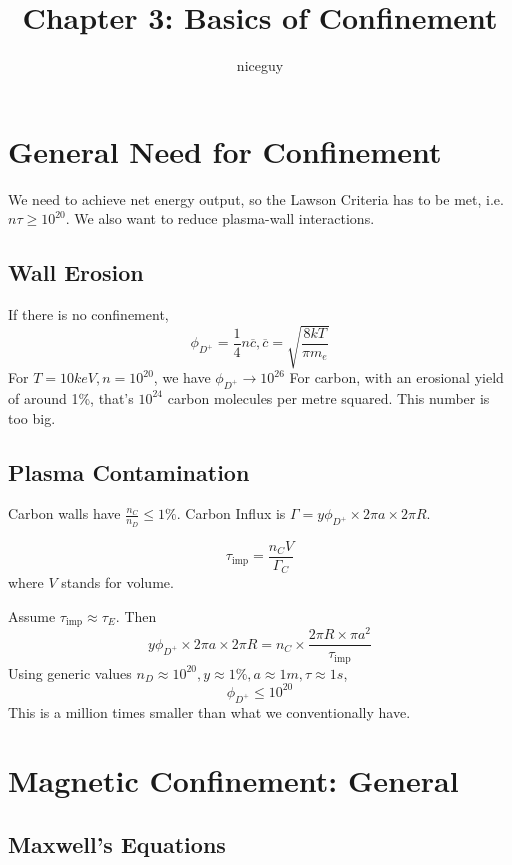 \documentclass[12pt]{article}
\title{Chapter 3: Basics of Confinement}
\author{niceguy}
\begin{document}
\maketitle

\section{General Need for Confinement}

We need to achieve net energy output, so the Lawson Criteria has to be met, i.e. $n\tau \geq 10^{20}$. We also want to reduce plasma-wall interactions.

\subsection{Wall Erosion}
If there is no confinement,
$$\phi_{D^+} = \frac{1}{4}n\overline c, \overline c = \sqrt{\frac{8kT}{\pi m_e}}$$
For $T = 10\unit{keV}, n = 10^{20}$, we have $\phi_{D^+} \rightarrow 10^{26}$
For carbon, with an erosional yield of around 1\%, that's $10^{24}$ carbon molecules per metre squared. This number is too big.

\subsection{Plasma Contamination}

\begin{ex}
    Carbon walls have $\frac{n_C}{n_D} \leq 1\%$. Carbon Influx is $\Gamma = y\phi_{D^+} \times 2\pi a \times 2 \pi R$.
    \begin{defn}
        $$\tau_{\text{imp}} = \frac{n_CV}{\Gamma_C}$$
        where $V$ stands for volume.
    \end{defn}
    Assume $\tau_{\text{imp}} \approx \tau_E$. Then
    $$y\phi_{D^+} \times 2\pi a \times 2\pi R = n_C \times \frac{2\pi R \times \pi a^2}{\tau_{\text{imp}}}$$
    Using generic values $n_D \approx 10^{20}, y \approx 1\%, a \approx 1\unit{m}, \tau \approx 1\unit{s}$,
    $$\phi_{D^+} \leq 10^{20}$$
    This is a million times smaller than what we conventionally have.
\end{ex}

\section{Magnetic Confinement: General}

\subsection{Maxwell's Equations}
\end{document}
